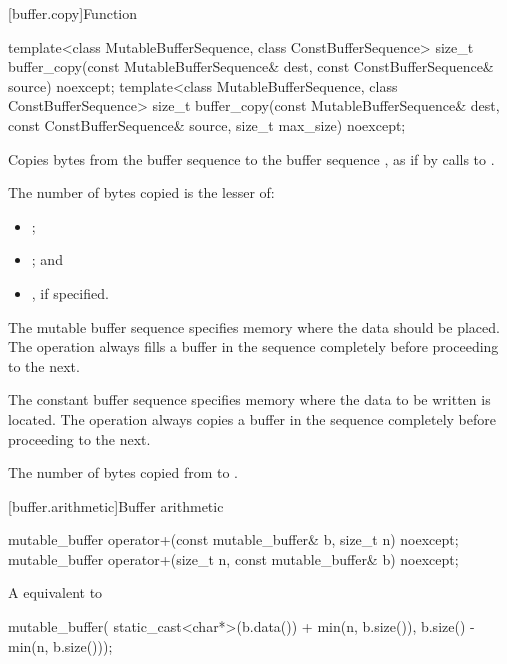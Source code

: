 [buffer.copy]{Function }

%
\begin{itemdecl}
template<class MutableBufferSequence, class ConstBufferSequence>
  size_t buffer_copy(const MutableBufferSequence& dest,
                     const ConstBufferSequence& source) noexcept;
template<class MutableBufferSequence, class ConstBufferSequence>
  size_t buffer_copy(const MutableBufferSequence& dest,
                     const ConstBufferSequence& source,
                     size_t max_size) noexcept;
\end{itemdecl}

\begin{itemdescr}
\pnum
\effects Copies bytes from the buffer sequence  to the buffer sequence , as if by calls to .

\pnum
The number of bytes copied is the lesser of:
\begin{itemize}
\item
{};
\item
{}; and
\item
{}, if specified.
\end{itemize}

\pnum
The mutable buffer sequence  specifies memory where the data should be placed. The operation always fills a buffer in the sequence completely before proceeding to the next.

\pnum
The constant buffer sequence  specifies memory where the data to be written is located. The operation always copies a buffer in the sequence completely before proceeding to the next.

\pnum
\returns The number of bytes copied from  to .
\end{itemdescr}



[buffer.arithmetic]{Buffer arithmetic}

\begin{itemdecl}
mutable_buffer operator+(const mutable_buffer& b, size_t n) noexcept;
mutable_buffer operator+(size_t n, const mutable_buffer& b) noexcept;
\end{itemdecl}

\begin{itemdescr}
\pnum
\returns A  equivalent to
\begin{codeblock}
mutable_buffer(
  static_cast<char*>(b.data()) + min(n, b.size()),
  b.size() - min(n, b.size()));
\end{codeblock}

\end{itemdescr}

